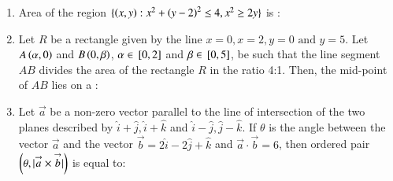 \documentclass[journal,,12pt,onecolumn]{IEEEtran}
\theoremstyle{remark}
\begin{document}
\begin{enumerate}
\item Area of the region $\{\left(x,y\right):x^2+\left(y-2\right)^2 \le 4,x^2 \ge 2y\}$ is :
\begin{enumerate}
\end{enumerate}
\bigskip
\item Let $R$ be a rectangle given by the line $x=0,x=2,y=0 \text{ and } y=5$. Let $A\left(\alpha,0\right)$ and $B\left(0,\beta\right)$, $\alpha \in {}\left[0,2\right]$ and $\beta \in {}\left[0,5\right]$, be such that the line segment $AB$ divides the area of the rectangle $R$ in the ratio 4:1. Then, the mid-point of $AB$ lies on a :
\begin{enumerate}
\end{enumerate}
\bigskip 
\item Let $\overset{\rightarrow}{a}$ be a non-zero vector parallel to the line of intersection of the two planes described by $\hat{i}+\hat{j},\hat{i}+\hat{k}$ and $\hat{i}-\hat{j},\hat{j}-\hat{k}$. If $\theta$ is the angle between the vector $\overset{\rightarrow}{a}$ and the vector $\overset{\rightarrow}{b}=2\hat{i}-2\hat{j}+\hat{k}$ and $\overset{\rightarrow}{a}\cdot\overset{\rightarrow}{b}=6$, then ordered pair $\left(\theta,|\overset{\rightarrow}{a}\times\overset{\rightarrow}{b}|\right)$ is equal to:
\begin{enumerate}
\end{enumerate}

\end{enumerate}
\end{document}
